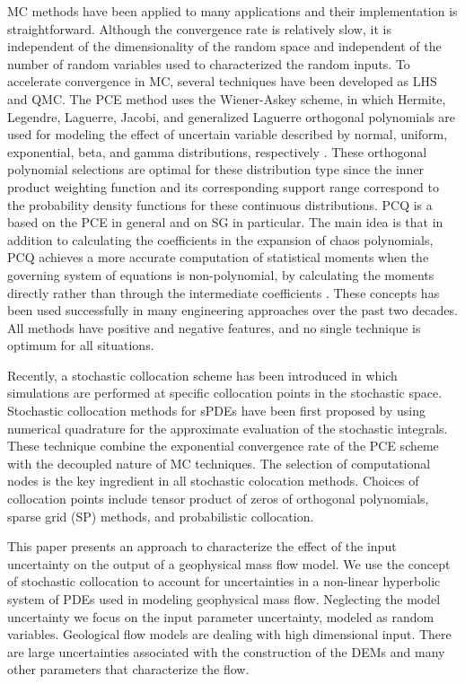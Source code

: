 \documentclass{article}
\begin{document}
MC methods have been applied to many applications and their implementation is straightforward.
Although the convergence rate is relatively slow, it is independent of the dimensionality of the random space and
independent of the number of random variables used to characterized the random inputs. 
To accelerate convergence in MC, several techniques have been developed as LHS and QMC.
The PCE method uses the Wiener-Askey scheme, in which Hermite, Legendre, Laguerre, Jacobi, and generalized Laguerre
orthogonal polynomials are used for modeling the effect of uncertain variable described by normal, uniform, exponential, beta, 
and gamma distributions, respectively \citep{ganapathysubramanian2007sparse, ma2009adaptive}. These orthogonal polynomial selections are optimal for these
distribution type since the inner product weighting function and its corresponding support range correspond to the probability density 
functions for these continuous distributions. 
PCQ is a based on the PCE in general and on SG in particular. The main idea is that in addition to 
calculating the coefficients in the expansion of chaos polynomials, PCQ achieves a more accurate computation of statistical 
moments when the governing system of equations is non-polynomial, by calculating the moments directly rather than
through the intermediate coefficients \citep{griebel1998adaptive, garcke2000computation}.
These concepts has been used successfully in many engineering approaches over the past two decades. 
All methods have positive and negative features, and no single technique is optimum for all situations.

Recently, a stochastic collocation scheme has been introduced in which simulations are performed
at specific collocation points in the stochastic space. Stochastic collocation methods for 
sPDEs have been first proposed by using numerical quadrature 
for the approximate evaluation of the stochastic integrals. 
These technique combine the exponential convergence rate of the PCE scheme with the
decoupled nature of MC techniques. The selection of computational nodes is 
the key ingredient in all stochastic colocation methods. Choices of collocation points include
tensor product of zeros of orthogonal polynomials, sparse grid (SP) methods,
and probabilistic collocation.


This paper presents an approach to characterize the effect of the input uncertainty on the output 
of a geophysical mass flow model. We use the concept of stochastic collocation to account for 
uncertainties in a non-linear hyperbolic system of PDEs used in modeling geophysical mass 
flow. Neglecting the model uncertainty we focus on the input parameter uncertainty, modeled as 
random variables. Geological flow models are dealing with high dimensional input. There are large 
uncertainties associated with the construction of the DEMs and many other parameters that characterize 
the flow.
\end{document}
